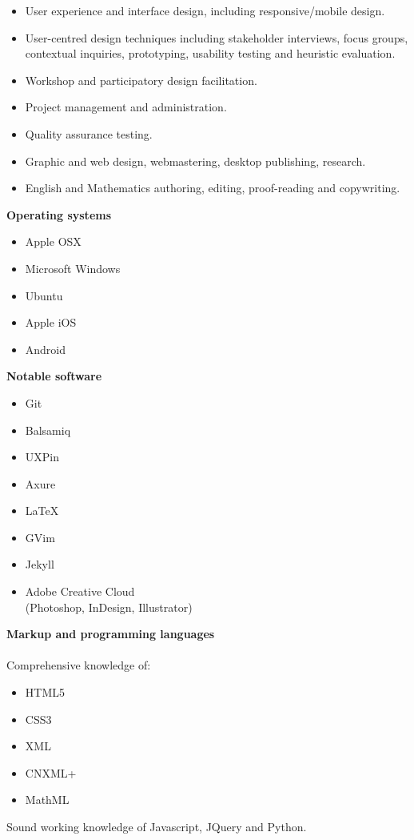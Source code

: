 \documentclass[]{friggeri-cv} %
\begin{document}
\begin{itemize}
\item User experience and interface design, including responsive/mobile design.
\item User-centred design techniques including stakeholder interviews, focus groups, contextual inquiries, prototyping, usability testing and heuristic evaluation.
\item Workshop and participatory design facilitation.
\item Project management and administration.
\item Quality assurance testing.
\item Graphic and web design, webmastering, desktop publishing, research.
\item English and Mathematics authoring, editing, proof-reading and copywriting.

\end{itemize}

\textbf{Operating systems}
\begin{multicols}{2}
\begin{itemize}
 \item Apple OSX
 \item Microsoft Windows
 \item Ubuntu
 \item Apple iOS
 \item Android
\end{itemize}
\end{multicols}

\textbf{Notable software}
\begin{multicols}{2}
\begin{itemize}
 \item Git
  \item Balsamiq
 \item UXPin
 \item Axure
 \item LaTeX
 \item GVim
 \item Jekyll
   \item Adobe Creative Cloud \\ (Photoshop, InDesign, Illustrator)
\end{itemize}
\end{multicols}

\textbf{Markup and programming languages}\\
\\
Comprehensive knowledge of: 
\begin{itemize}
 \item HTML5
 \item CSS3
 \item XML
 \item CNXML+
 \item MathML
 \end{itemize}
Sound working knowledge of Javascript, JQuery and Python.
\end{document}

